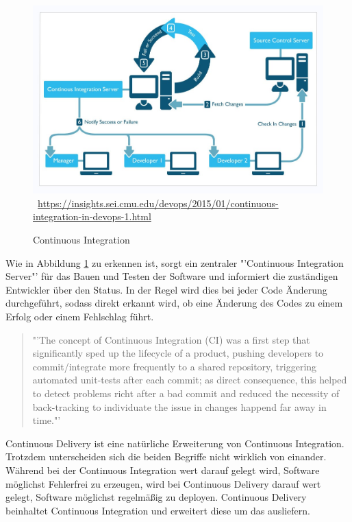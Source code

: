 \begin{figure}[htb]
	\centering 
	\includegraphics[width=\linewidth]{content/images/continuous_integration}\
	\quelle\url{https://insights.sei.cmu.edu/devops/2015/01/continuous-integration-in-devops-1.html}
	\caption[Continuous Integration]{Continuous Integration\\}
	\label{fig:ContinuousIntegration}  
\end{figure}
\newpage
Wie in Abbildung \ref{fig:ContinuousIntegration}  zu erkennen ist, sorgt ein zentraler "'Continuous Integration Server"' für das Bauen und Testen der Software und informiert die zuständigen Entwickler über den Status. In der Regel wird dies bei jeder Code Änderung durchgeführt, sodass direkt erkannt wird, ob eine Änderung des Codes zu einem Erfolg oder einem Fehlschlag führt.

\begin{quote}
	"'The concept of Continuous Integration (CI) was a first step that significantly sped up the lifecycle of a product, pushing developers to commit/integrate more frequently to a shared repository, triggering automated unit-tests after each commit; as direct consequence, this helped to detect problems richt after a bad commit and reduced the necessity of back-tracking to individuate the issue in changes happend far away in time."'\cite[in Introduction]{IEEE:CDMitJenkins}
\end{quote}
Continuous Delivery ist eine natürliche Erweiterung von Continuous Integration. Trotzdem unterscheiden sich die beiden Begriffe nicht wirklich von einander. Während bei der Continuous Integration wert darauf gelegt wird, Software möglichst Fehlerfrei zu erzeugen, wird bei Continuous Delivery  darauf wert gelegt, Software möglichst regelmäßig zu deployen. Continuous Delivery beinhaltet Continuous Integration und erweitert diese um das ausliefern.


